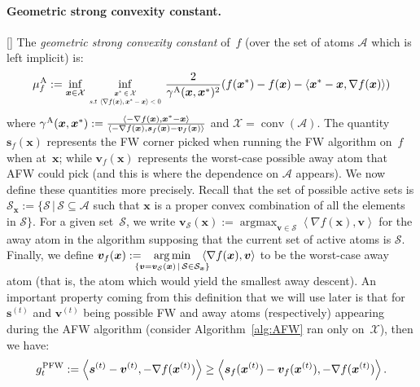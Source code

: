 \documentclass[twoside]{article}
\newcommand{\X}{\mathcal{X}}
\newcommand{\prodscal}[2]{\left\langle#1,#2\right\rangle}
\newcommand{\x}{\bm{x}}
\newcommand{\s}{\bm{s}}
\newcommand{\xt}{\bm{x}^{(t)}}
\newcommand{\st}{\bm{s}^{(t)}}
\newcommand{\vt}{\bm{v}^{(t)}}
\renewcommand{\SS}{ \bm{S}}
\newcommand{\gap}{g_{t}}
\DeclareMathOperator*{\conv}{conv}
\DeclareMathOperator*{\argmin}{\arg\min}
\DeclareMathOperator*{\argmax}{\arg\max}
\newcommand{\PW}{{\hspace{0.05em}\textnormal{PFW}}}
\newcommand{\away}{{\hspace{0.05em}\textnormal{A}}}
\newcommand{\vv}{\bm{v}} %
\newcommand{\A}{\mathcal{A}}
\renewcommand{\SS}{\mathcal{S}}
\newcommand{\0}{\mathbf{0}} %
\begin{document}
\paragraph{Geometric strong convexity constant.}[\citet{lacoste2015global}] %
\label{par:strong_}
%
   The \emph{geometric strong convexity constant} of~$f$ (over the set of atoms $\A$ which is left implicit) is: 
    \begin{equation} \label{def:geom_strong}
    \mu^{\away}_f := 
            \underset{ \x \in \X}{\inf}
            \inf_{\substack{\scalebox{0.6}{
            $\begin{matrix}
                          \x^* \in \X  \\
                          s.t \;   \prodscal{\nabla f(\x)}{\x^* - \x} <0
             \end{matrix}$
              }}}
          \frac{2}{\gamma^\away(\x,\x^*)^2}( f(\x^*)-f(\x)- \prodscal{\x^*-\x}{ \nabla f(\x)}) 
      \end{equation}
  where $\gamma^\away(\x,\x^*) := \frac{\prodscal{-\nabla f(\x)}{\x^*-\x}}{\prodscal{-\nabla f(\x)}{\s_f(\x)-\vv_f(\x)}}$ and $\X = \conv(\A)$. The quantity $\s_f(\x)$ represents the FW corner picked when running the FW algorithm on~$f$ when at~$\x$; while $\vv_f(\x)$ represents the worst-case possible away atom that AFW could pick (and this is where the dependence on $\A$ appears). We now define these quantities more precisely. Recall that the set of possible active sets is $\SS_{\x} := \{ \SS \, | \, \SS \subseteq \A$ such that $\x$ is a
  proper convex combination of
  all the elements in $\SS\}$.
  For a given set~$\SS$, we write $\vv_{\SS}(\x) := \argmax_{\vv \in \SS }
  \left\langle \nabla f(\x), \vv \right\rangle$ for the away atom in the
  algorithm supposing that the current set of active atoms is $\SS$.
  Finally, we define $\vv_f(\x) := \hspace{-3mm}\displaystyle\argmin_{\{\vv = \vv_{\SS}(\x)
  \,|\, \SS \in \SS_{\x} \}} \textstyle \hspace{-3mm}\left\langle \nabla f(\x), \vv
  \right\rangle$ to be the worst-case away atom (that is, the atom which would
  yield the smallest away descent). An important property coming from this definition that we will use later is that for $\st$ and $\vt$ being possible FW and away atoms (respectively) appearing during the AFW algorithm (consider Algorithm~\ref{alg:AFW} ran only on~$\X$), then we have:
  \begin{equation}
    \label{eq:gammaA}
    \gap^{\PW} := \prodscal{\st - \vt}{- \nabla f (\xt)} \geq \prodscal{\s_f(\xt) - \vv_f(\xt)}{- \nabla f (\xt)}.
  \end{equation}
\end{document}
